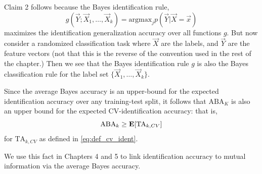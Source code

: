 Claim 2 follows because the Bayes identification rule,
\[
g(\vec{Y}; \vec{X}_1,\hdots, \vec{X}_k) = \text{argmax}_j p(\vec{Y}|\vec{X} = \vec{x})
\]
maximizes the identification generalization accuracy over all
functions $g$.  But now consider a randomized classification task
where $\vec{X}$ are the labels, and $\vec{Y}$ are the feature vectors
(not that this is the reverse of the convention used in the rest of
the chapter.)  Then we see that the Bayes identification rule $g$ is
also the Bayes classification rule for the label set $\{\vec{X}_1,
\hdots, \vec{X}_k\}$.

Since the average Bayes accuracy is an upper-bound for the expected
identification accuracy over any training-test split, it follows that
$\text{ABA}_K$ is also an upper bound for the expected
CV-identification accuracy: that is,
\begin{equation}\label{eq:aba_cv_ident_bound}
\text{ABA}_k \geq \textbf{E}[\text{TA}_{k, CV}]
\end{equation}
for $\text{TA}_{k, CV}$ as defined in \eqref{eq:def_cv_ident}.

We use this fact in Chapters 4 and 5 to link identification accuracy
to mutual information via the average Bayes accuracy.
